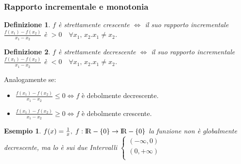 \documentclass[12pt, a4paper]{article}
\theoremstyle{break}
\newtheorem{definition}{Definizione}[subsection]
\newtheorem{example}{Esempio}[subsection]
\newcommand\R{{\rm I\!R}}
\begin{document}
    \subsubsection{Rapporto incrementale e monotonia}
    \begin{definition}
        $f$ è strettamente crescente $\Leftrightarrow$ il suo rapporto incrementale $\frac{f(x_1)-f(x_2)}{x_1-x_2}$ è $> 0\quad \forall x_1,\,x_2. x_1\neq x_2$.
    \end{definition}
    \begin{definition}
        $f$ è strettamente decrescente $\Leftrightarrow$ il suo rapporto incrementale $\frac{f(x_1) - f(x_2)}{x_1-x_2}$ è $< 0\quad \forall x_1,\,x_2. x_1\neq x_2$.
    \end{definition}
    Analogamente se:
    \begin{itemize}
        \item $\frac{f(x_1)-f(x_2)}{x_1-x_2} \leq 0\Leftrightarrow f$ è debolmente decrescente.  
        \item $\frac{f(x_1)-f(x_2)}{x_1-x_2} \geq 0\Leftrightarrow f$ è debolmente crescente. 
    \end{itemize}
    \begin{example}
        $f(x) = \frac{1}{x},\; f:\R-\{0\} \rightarrow \R-\{0\}$ la funzione non è globalmente decrescente, \newline
        ma lo è sui due Intervalli
        $\left\{
            \begin{matrix}
                (-\infty, 0) \\
                (0,+\infty) \\
            \end{matrix}
        \right.$
    \end{example}
    \begin{figure}[!htb]
        \centering
    \end{figure}
    \newpage
\end{document}
